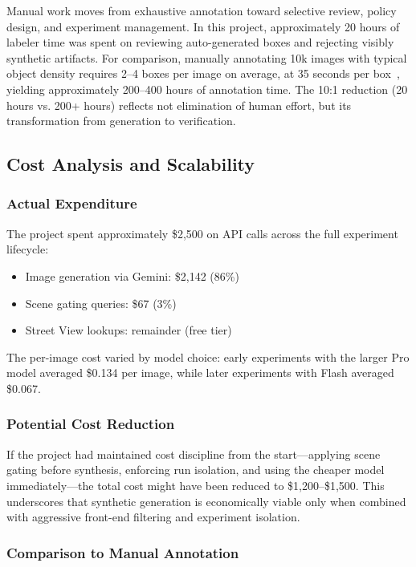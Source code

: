 \documentclass[12pt,a4paper]{article}
\begin{document}
Manual work moves from exhaustive annotation toward selective review, policy design, and experiment management. In this project, approximately 20 hours of labeler time was spent on reviewing auto-generated boxes and rejecting visibly synthetic artifacts. For comparison, manually annotating 10k images with typical object density requires 2--4 boxes per image on average, at 35 seconds per box~\cite{papadopoulos2017extreme}, yielding approximately 200--400 hours of annotation time. The 10:1 reduction (20 hours vs. 200+ hours) reflects not elimination of human effort, but its transformation from generation to verification.

\subsection{Cost Analysis and Scalability}

\subsubsection{Actual Expenditure}

The project spent approximately \$2,500 on API calls across the full experiment lifecycle:

\begin{itemize}
	\item Image generation via Gemini: \$2,142 (86\%)
	\item Scene gating queries: \$67 (3\%)
	\item Street View lookups: remainder (free tier)
\end{itemize}

The per-image cost varied by model choice: early experiments with the larger Pro model averaged \$0.134 per image, while later experiments with Flash averaged \$0.067.

\subsubsection{Potential Cost Reduction}

If the project had maintained cost discipline from the start---applying scene gating before synthesis, enforcing run isolation, and using the cheaper model immediately---the total cost might have been reduced to \$1,200--\$1,500. This underscores that synthetic generation is economically viable only when combined with aggressive front-end filtering and experiment isolation.

\subsubsection{Comparison to Manual Annotation}
\end{document}
